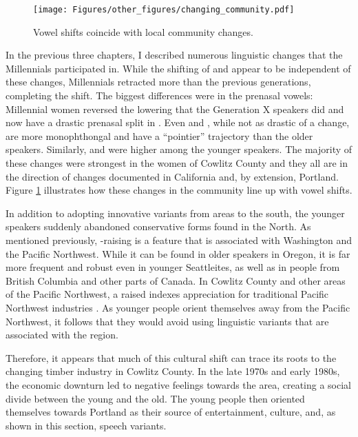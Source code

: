 \begin{figure}[tb!]
    \centering
    \texttt{[image: Figures/other\_figures/changing\_community.pdf]}
    \caption{Vowel shifts coincide with local community changes.}
    \label{fig:changing_community}
\end{figure}

In the previous three chapters, I described numerous linguistic changes that the Millennials participated in. While the shifting of \bat and \bet appear to be independent of these changes, Millennials retracted \bit more than the previous generations, completing the shift. The biggest differences were in the prenasal vowels: Millennial women reversed the \ban lowering that the Generation X speakers did and now have a drastic prenasal split in \trap. Even \ben and \bin, while not as drastic of a change, are more monophthongal and have a ``pointier'' trajectory than the older speakers. Similarly, \bang and \bing were higher among the younger speakers. The majority of these changes were strongest in the women of Cowlitz County and they all are in the direction of changes documented in California and, by extension, Portland. Figure \ref{fig:changing_community} illustrates how these changes in the community line up with vowel shifts.

In addition to adopting innovative variants from areas to the south, the younger speakers suddenly abandoned conservative forms found in the North. As mentioned previously, \bag-raising is a feature that is associated with Washington and the Pacific Northwest. While it can be found in older speakers in Oregon, it is far more frequent and robust even in younger Seattleites, as well as in people from British Columbia and other parts of Canada. In Cowlitz County and other areas of the Pacific Northwest, a raised \bag indexes appreciation for traditional Pacific Northwest industries \citep{swan_2018_CWSL, stanley_2018_pwpl}. As younger people orient themselves away from the Pacific Northwest, it follows that they would avoid using linguistic variants that are associated with the region.

Therefore, it appears that much of this cultural shift can trace its roots to the changing timber industry in Cowlitz County. In the late 1970s and early 1980s, the economic downturn led to negative feelings towards the area, creating a social divide between the young and the old. The young people then oriented themselves towards Portland as their source of entertainment, culture, and, as shown in this section, speech variants.





